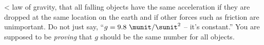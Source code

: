 <%
law of gravity, that all falling objects have the same
acceleration if they are dropped at the same location on the
earth and if other forces such as friction are unimportant.
Do not just say, ``$g=9.8\ \munit/\sunit^2$ -- it's constant.''  You
are supposed to be \emph{proving} that $g$ should be the
same number for all objects.
